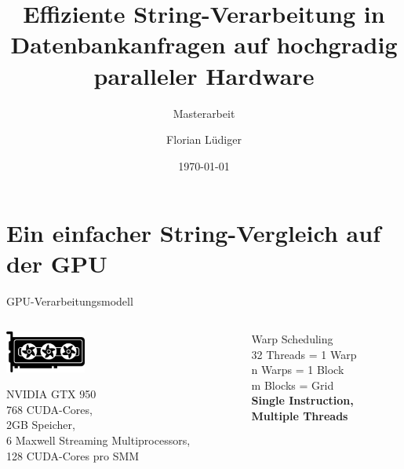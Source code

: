 \documentclass{beamer}
\title{Effiziente String-Verarbeitung in Datenbankanfragen auf hochgradig paralleler Hardware}
\subtitle{Masterarbeit}
\date{\today}
\author{Florian Lüdiger}
\institute{Fakultät Informatik - Lehrstuhl 6 - TU Dortmund}
\begin{document}
	\maketitle
	
	\section{Ein einfacher String-Vergleich auf der GPU}
	\begin{frame}{GPU-Verarbeitungsmodell}
		\begin{columns}[T] %
			\begin{column}{.48\textwidth}				
				\includegraphics[width=100px]{grafikkarte.png}
				
				\huge
				NVIDIA GTX 950\\
				\normalsize
				\vspace{0.5\baselineskip}
				768 CUDA-Cores,\\
				2GB Speicher,\\
				6 Maxwell Streaming Multiprocessors,\\
				128 CUDA-Cores pro SMM
			\end{column}%
			\vrule
			\hfill%
			\begin{column}{.48\textwidth}				
				\huge
				Warp Scheduling\\
				\normalsize
				\vspace{0.5\baselineskip}
				32 Threads = 1 Warp\\
				n Warps = 1 Block\\
				m Blocks = Grid\\
				\vspace{5em}
				\Large
				\textbf{Single Instruction,\\ Multiple Threads}
			\end{column}%
		\end{columns}
	\end{frame}
\end{document}
